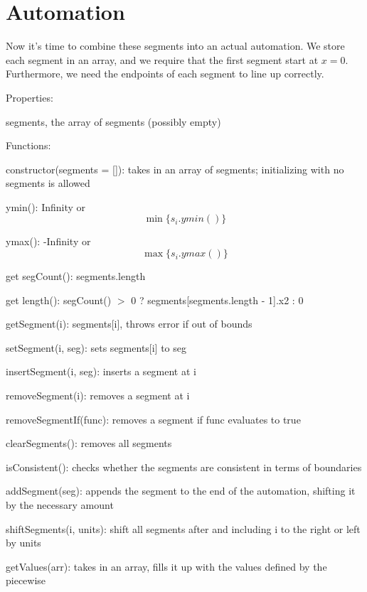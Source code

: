 \documentclass{article}
\begin{document}







\section{Automation}

Now it's time to combine these segments into an actual automation. We store each segment in an array, and we require that the first segment start at $x=0$. Furthermore, we need the endpoints of each segment to line up correctly.

Properties:

segments, the array of segments (possibly empty)

Functions:

constructor(segments = []): takes in an array of segments; initializing with no segments is allowed

ymin(): Infinity or $$\min\{s_i.ymin()\}$$

ymax(): -Infinity or $$\max\{s_i.ymax()\}$$

get segCount(): segments.length

get length(): segCount() $>$ 0 ? segments[segments.length - 1].x2 : 0

getSegment(i): segments[i], throws error if out of bounds

setSegment(i, seg): sets segments[i] to seg

insertSegment(i, seg): inserts a segment at i

removeSegment(i): removes a segment at i

removeSegmentIf(func): removes a segment if func evaluates to true

clearSegments(): removes all segments

isConsistent(): checks whether the segments are consistent in terms of boundaries

addSegment(seg): appends the segment to the end of the automation, shifting it by the necessary amount

shiftSegments(i, units): shift all segments after and including i to the right or left by units

getValues(arr): takes in an array, fills it up with the values defined by the piecewise
\end{document}
